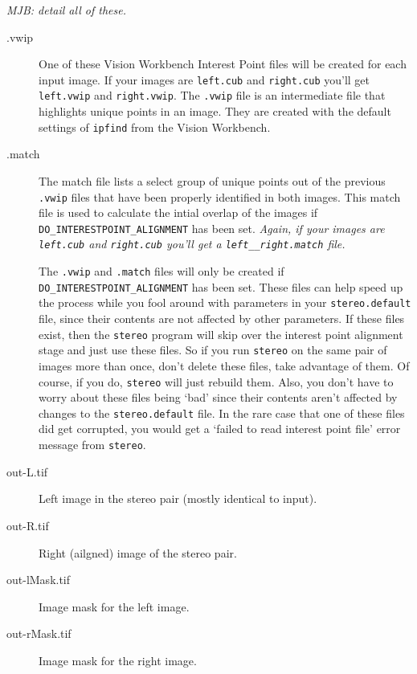 \emph{MJB: detail all of these.}

\begin{description}

\item[.vwip] 
One of these Vision Workbench Interest Point files will be created
for each input image. If your images are \texttt{left.cub}
and \texttt{right.cub} you'll get \texttt{left.vwip} and
\texttt{right.vwip}. The \texttt{.vwip} file is an intermediate
file that highlights unique points in an image. They are created
with the default settings of \texttt{ipfind} from the Vision
Workbench.

\item[.match] 
The match file lists a select group of unique points out of the 
previous \texttt{.vwip} files that have been properly identified 
in both images. This match file is used to calculate the intial 
overlap of the images if \texttt{DO\_INTERESTPOINT\_ALIGNMENT} has 
been set.  \emph{Again, if your images are \texttt{left.cub} and 
\texttt{right.cub} you'll get a \texttt{left\_\_right.match} file.}

The \texttt{.vwip} and \texttt{.match} files will 
only be created if \texttt{DO\_INTERESTPOINT\_ALIGNMENT}
has been set.  These files can help speed up the process while you
fool around with parameters in your \texttt{stereo.default} file,
since their contents are not affected by other parameters.  If these
files exist, then the \texttt{stereo} program will skip over the
interest point alignment stage and just use these files.  So if you
run \texttt{stereo} on the same pair of images more than once, don't
delete these files, take advantage of them.  Of course, if you do,
\texttt{stereo} will just rebuild them.  Also, you don't have to
worry about these files being `bad' since their contents aren't
affected by changes to the \texttt{stereo.default} file.  In the
rare case that one of these files did get corrupted, you would get
a `failed to read interest point file' error message from
\texttt{stereo}.

\item[out-L.tif]
Left image in the stereo pair (mostly identical to input).

\item[out-R.tif]
Right (ailgned) image of the stereo pair.

\item[out-lMask.tif] Image mask for the left image.
\item[out-rMask.tif] Image mask for the right image.


\end{description}
